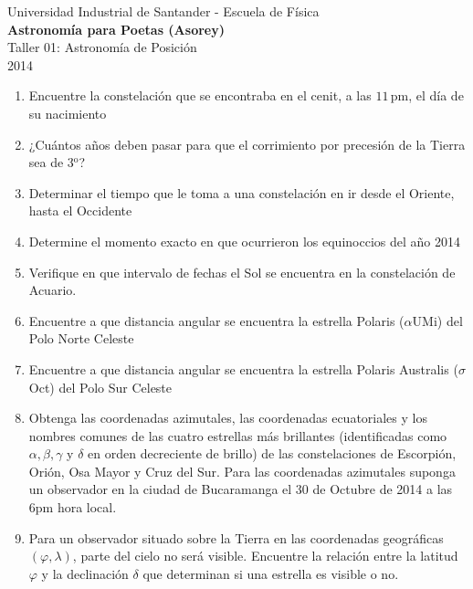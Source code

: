 \documentclass[a4paper,12pt]{article}
\begin{document}
\begin{center}
  {\small{Universidad Industrial de Santander - Escuela de Física}}\\
  {\bf{Astronomía para Poetas (Asorey)}}\\
  \vspace{0.4cm}
  Taller 01: Astronomía de Posición\\ 2014
\end{center}

\renewcommand{\labelenumi}{\arabic{enumi})}
\renewcommand{\labelenumii}{\arabic{enumii})}

\begin{enumerate}

  \item Encuentre la constelación que se encontraba en el cenit, a las
    $11$\,pm, el día de su nacimiento
  
  \item ¿Cuántos años deben pasar para que el corrimiento por precesión de la
    Tierra sea de 3$^\mathrm{o}$?

  \item Determinar el tiempo que le toma a una constelación en ir desde el
    Oriente, hasta el Occidente

  \item Determine el momento exacto en que ocurrieron los equinoccios del año
    2014

  \item Verifique en que intervalo de fechas el Sol se encuentra en la
    constelación de Acuario.

  \item Encuentre a que distancia angular se encuentra la estrella Polaris
    ($\alpha$UMi) del Polo Norte Celeste
  
  \item Encuentre a que distancia angular se encuentra la estrella Polaris
    Australis ($\sigma$Oct) del Polo Sur Celeste

  \item Obtenga las coordenadas azimutales, las coordenadas ecuatoriales y los
    nombres comunes de las cuatro estrellas más brillantes (identificadas como
    $\alpha, \beta, \gamma$ y $\delta$ en orden decreciente de brillo) de las
    constelaciones de Escorpión, Orión, Osa Mayor y Cruz del Sur. Para las
    coordenadas azimutales suponga un observador en la ciudad de Bucaramanga el
    30 de Octubre de 2014 a las 6pm hora local.

  \item Para un observador situado sobre la Tierra en las coordenadas
    geográficas $(\varphi,\lambda)$, parte del cielo no será visible. Encuentre
    la relación entre la latitud $\varphi$ y la declinación $\delta$ que
    determinan si una estrella es visible o no.


\end{enumerate}
\end{document}
